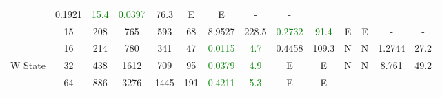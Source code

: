 \begin{table}[htb]
{\begin{tabular}{|c|c|c|c|c|c|c|c|c|c|c|c|c|c|}
 & 0.1921 & \textcolor{green}{15.4}
 & \textcolor{green}{0.0397} & 76.3
 & E & E
 & - & -
 \\
 & 
15 & 208 & 765 & 593 & 68
 & 8.9527 & 228.5
 & \textcolor{green}{0.2732} & \textcolor{green}{91.4}
 & E & E
 & - & -
 \\
\hline
 & 
16 & 214 & 780 & 341 & 47
 & \textcolor{green}{0.0115} & \textcolor{green}{4.7}
 & 0.4458 & 109.3
 & N & N 
 & 1.2744 & 27.2
 \\
W State & 
32 & 438 & 1612 & 709 & 95
 & \textcolor{green}{0.0379} & \textcolor{green}{4.9}
 & E & E
 & N & N 
 & 8.761 & 49.2
 \\
 & 
64 & 886 & 3276 & 1445 & 191
 & \textcolor{green}{0.4211} & \textcolor{green}{5.3}
 & E & E
 & - & -
 & - & -
 \\
\hline
\end{tabular}}
\end{table}